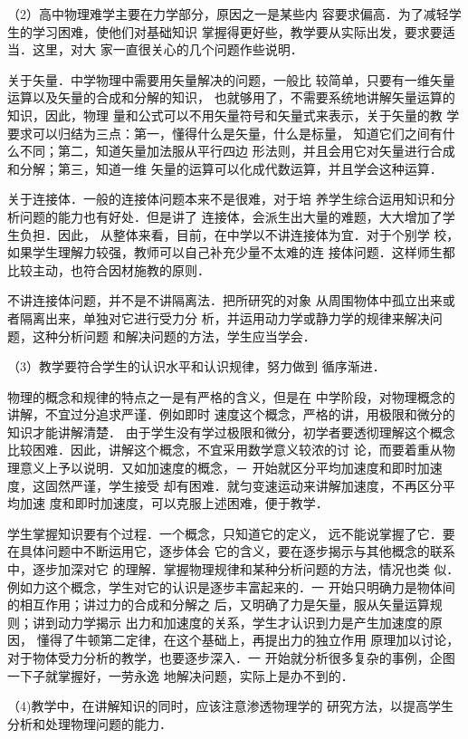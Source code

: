 （2）高中物理难学主要在力学部分，原因之一是某些内
容要求偏高．为了减轻学生的学习困难，使他们对基础知识
掌握得更好些，教学要从实际出发，要求要适当．这里，对大
家一直很关心的几个问题作些说明．

关于矢量．中学物理中需要用矢量解决的问题，一般比
较简单，只要有一维矢量运算以及矢量的合成和分解的知识，
也就够用了，不需要系统地讲解矢量运算的知识，因此，物理
量和公式可以不用矢量符号和矢量式来表示，关于矢量的教
学要求可以归结为三点：第一，懂得什么是矢量，什么是标量，
知道它们之间有什么不同；第二，知道矢量加法服从平行四边
形法则，并且会用它对矢量进行合成和分解；第三，知道一维
矢量的运算可以化成代数运算，并且学会这种运算．

关于连接体．一般的连接体问题本来不是很难，对于培
养学生综合运用知识和分析问题的能力也有好处．但是讲了
连接体，会派生出大量的难题，大大增加了学生负担．因此，
从整体来看，目前，在中学以不讲连接体为宜．对于个别学
校，如果学生理解力较强，教师可以自己补充少量不太难的连
接体问题．这样师生都比较主动，也符合因材施教的原则．

不讲连接体问题，并不是不讲隔离法．把所研究的对象
从周围物体中孤立出来或者隔离出来，单独对它进行受力分
析，并运用动力学或静力学的规律来解决问题，这种分析问题
和解决问题的方法，学生应当学会．

（3）教学要符合学生的认识水平和认识规律，努力做到
循序渐进．

物理的概念和规律的特点之一是有严格的含义，但是在
中学阶段，对物理概念的讲解，不宜过分追求严谨．例如即时
速度这个概念，严格的讲，用极限和微分的知识才能讲解清楚．
由于学生没有学过极限和微分，初学者要透彻理解这个概念
比较困难．因此，讲解这个概念，不宜采用数学意义较浓的讨
论，而要着重从物理意义上予以说明．又如加速度的概念，－
开始就区分平均加速度和即时加速度，这固然严谨，学生接受
却有困难．就匀变速运动来讲解加速度，不再区分平均加速
度和即时加速度，可以克服上述困难，便于教学．

学生掌握知识要有个过程．一个概念，只知道它的定义，
远不能说掌握了它．要在具体问题中不断运用它，逐步体会
它的含义，要在逐步揭示与其他概念的联系中，逐步加深对它
的理解．掌握物理规律和某种分析问题的方法，情况也类
似．例如力这个概念，学生对它的认识是逐步丰富起来的．一
开始只明确力是物体间的相互作用；讲过力的合成和分解之
后，又明确了力是矢量，服从矢量运算规则；讲到动力学揭示
出力和加速度的关系，学生才认识到力是产生加速度的原因，
懂得了牛顿第二定律，在这个基础上，再提出力的独立作用
原理加以讨论，对于物体受力分析的教学，也要逐步深入．一
开始就分析很多复杂的事例，企图一下子就掌握好，一劳永逸
地解决问题，实际上是办不到的．

（4)教学中，在讲解知识的同时，应该注意渗透物理学的
研究方法，以提高学生分析和处理物理问题的能力．


